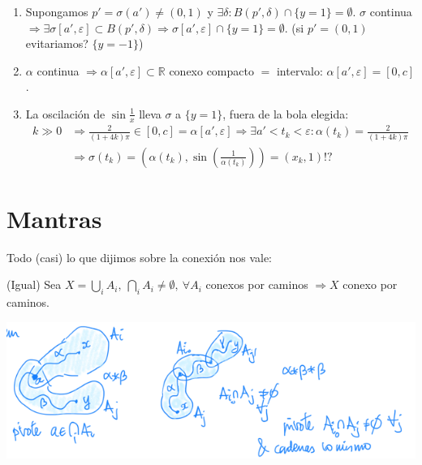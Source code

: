 \begin{ej}
\begin{enumerate}
\begin{demo}
\begin{enumerate}
            \item Supongamos $p' = \sigma\left( a' \right) \neq \left( 0, 1 \right)$ y $\exists \delta: B\left( p', \delta \right) \cap \{y = 1\} = \emptyset$. $\sigma$ continua $\Rightarrow \exists \sigma\left[ a', \varepsilon \right] \subset B\left( p', \delta \right) \Rightarrow \sigma\left[ a', \varepsilon \right] \cap \{y = 1\} = \emptyset$. (si $p' = \left( 0, 1 \right)$ evitariamos? $\{y = -1\}$)

            \item $\alpha$ continua $\Rightarrow \alpha\left[ a', \varepsilon \right] \subset \mathbb{R}$ conexo compacto $=$ intervalo: $\alpha\left[ a', \varepsilon \right] = \left[ 0, c \right]$.

            \item La oscilación de $\sin \frac{1}{x}$ lleva $\sigma$ a $\{y = 1\}$, fuera de la bola elegida:
            \begin{align*}
            k \gg 0 &\Rightarrow \frac{2}{\left( 1 + 4k \right) \pi} \in \left[ 0, c \right] = \alpha\left[ a', \varepsilon \right] \Rightarrow \exists a' < t_k < \varepsilon: \alpha\left( t_k \right) = \frac{2}{\left( 1 + 4k \right) \pi}\\ 
                &\Rightarrow \sigma\left( t_k \right) = \left( \alpha\left( t_k \right), \sin\left( \frac{1}{\alpha\left( t_k \right)} \right) \right) = \left( x_k, 1 \right) 
            !?\end{align*}
        \end{enumerate}
    \end{demo}
\end{enumerate}
\end{ej}

\section{Mantras}%
\label{sec:mantras_conx_caminos}
Todo (casi) lo que dijimos sobre la conexión nos vale:
\begin{prop}
    (Igual) Sea $X = \bigcup_{i} A_i,\ \bigcap_{i} A_i \neq \emptyset,\ \forall A_i$ conexos por caminos $\Rightarrow X$ conexo por caminos. 
\end{prop}
\begin{demo}
\begin{center}
    \includegraphics[scale=0.3]{images/dem_pivote_caminos} 
\end{center}
\end{demo}

